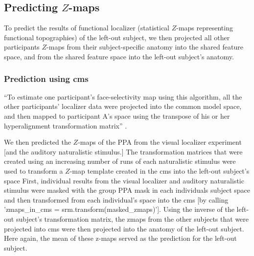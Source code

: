 \subsection{Predicting $Z$-maps}

%
To predict the results of functional localizer (statistical $Z$-maps
representing functional topographies) of the left-out subject, we then projected
all other participants $Z$-maps from their subject-specific anatomy into the
shared feature space, and from the shared feature space into the left-out
subject's anatomy.


\subsubsection{Prediction using \ac{cms}}
%
``To estimate one participant's face-selectivity map using this algorithm, all
the other participants' localizer data were projected into the common model
space, and then mapped to participant A's space using the transpose of his or
her hyperalignment transformation matrix'' \citep{jiahui2020predicting}.


We then predicted the $Z$-maps of the PPA from the visual localizer experiment
[and the auditory naturalistic stimulus.]
%
The transformation matrices that were created using an increasing number of runs
of each naturalistic stimulus were used to transform a $Z$-map template created
in the \ac{cms} into the left-out subject's space
%
First, individual results from the visual localizer and auditory naturalistic
stimulus were masked with the group PPA mask in each individuals subject space
and then transformed from each individual's space into the \ac{cms} [by calling
'zmaps\_in\_cms = srm.transform(masked\_zmaps)'].
Using the inverse of the left-out subject's transformation matrix, the zmaps
from the other subjects that were projected into \ac{cms} were then projected
into the anatomy of the left-out subject.
%
Here again, the mean of these z-maps served as the prediction for the left-out
subject.


